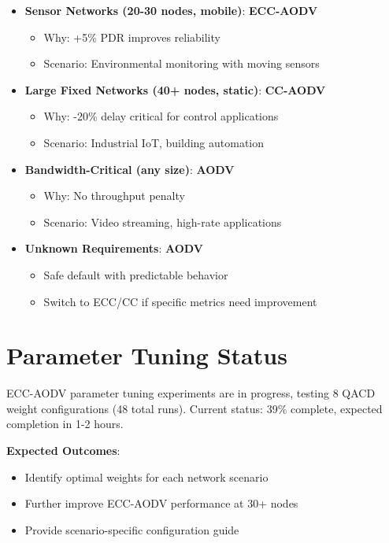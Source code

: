\documentclass[12pt]{article}
\begin{document}
\begin{itemize}
    \item \textbf{Sensor Networks (20-30 nodes, mobile)}: \textbf{ECC-AODV}
    \begin{itemize}
        \item Why: +5\% PDR improves reliability
        \item Scenario: Environmental monitoring with moving sensors
    \end{itemize}
    
    \item \textbf{Large Fixed Networks (40+ nodes, static)}: \textbf{CC-AODV}
    \begin{itemize}
        \item Why: -20\% delay critical for control applications
        \item Scenario: Industrial IoT, building automation
    \end{itemize}
    
    \item \textbf{Bandwidth-Critical (any size)}: \textbf{AODV}
    \begin{itemize}
        \item Why: No throughput penalty
        \item Scenario: Video streaming, high-rate applications
    \end{itemize}
    
    \item \textbf{Unknown Requirements}: \textbf{AODV}
    \begin{itemize}
        \item Safe default with predictable behavior
        \item Switch to ECC/CC if specific metrics need improvement
    \end{itemize}
\end{itemize}

\section*{Parameter Tuning Status}

ECC-AODV parameter tuning experiments are in progress, testing 8 QACD weight configurations (48 total runs). Current status: 39\% complete, expected completion in 1-2 hours.

\textbf{Expected Outcomes}:
\begin{itemize}
    \item Identify optimal weights for each network scenario
    \item Further improve ECC-AODV performance at 30+ nodes
    \item Provide scenario-specific configuration guide
\end{itemize}
\end{document}
